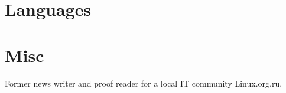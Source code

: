 \section{Languages}

\section{Misc}
Former news writer and proof reader for a local IT community Linux.org.ru.
